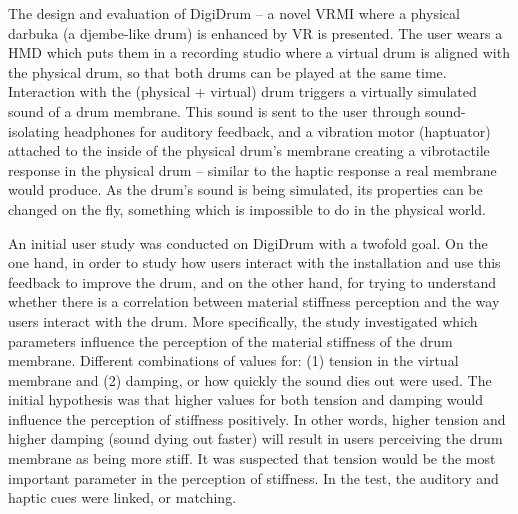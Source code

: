 \documentclass{article}
\begin{document}
The design and evaluation of DigiDrum -- a novel VRMI where a physical darbuka (a djembe-like drum) is enhanced by VR is presented. The user wears a HMD which puts them in a recording studio where a virtual drum is aligned with the physical drum, so that both drums can be played at the same time. Interaction with the (physical + virtual) drum triggers a virtually simulated sound of a drum membrane. This sound is sent to the user through sound-isolating headphones for auditory feedback, and a vibration motor (haptuator) attached to the inside of the physical drum's membrane creating a vibrotactile response in the physical drum -- similar to the haptic response a real membrane would produce. As the drum's sound is being simulated, its properties can be changed on the fly, something which is impossible to do in the physical world. 


An initial user study was conducted on DigiDrum with a twofold goal. On the one hand, in order to study how users interact with the installation and use this feedback to improve the drum, and on the other hand, for trying to understand whether there is a correlation between material stiffness perception and the way users interact with the drum. More specifically, the study investigated which parameters influence the perception of the material stiffness of the drum membrane. Different combinations of values for: (1) tension in the virtual membrane and (2) damping, or how quickly the sound dies out were used. The initial hypothesis was that higher values for both tension and damping would influence the perception of stiffness positively. In other words, higher tension and higher damping (sound dying out faster) will result in users perceiving the drum membrane as being more stiff. It was suspected that tension would be the most important parameter in the perception of stiffness. In the test, the auditory and haptic cues were linked, or matching. 
\end{document}
